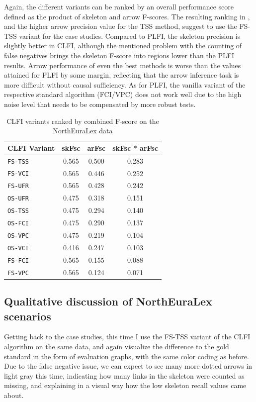 Again, the different variants can be ranked by an overall performance score defined as the product of skeleton and arrow F-scores. The resulting ranking in , and the higher arrow precision value for the TSS method, suggest to use the FS-TSS variant for the case studies. Compared to PLFI, the skeleton precision is slightly better in CLFI, although the mentioned problem with the counting of false negatives brings the skeleton F-score into regions lower than the PLFI results. Arrow performance of even the best methods is worse than the values attained for PLFI by some margin, reflecting that the arrow inference task is more difficult without causal sufficiency. As for PLFI, the vanilla variant of the respective standard algorithm (FCI/VPC) does not work well due to the high noise level that needs to be compensated by more robust tests.

\begin{table}
 \centering
 \begin{tabular}{lccc}
 \hline \hline
  CLFI Variant & skFsc & arFsc & skFsc $\ast$ arFsc\\ 
 \hline
\texttt{FS-TSS} & 0.565 & 0.500 & 0.283\\
\texttt{FS-VCI} & 0.565 & 0.446 & 0.252\\
\texttt{FS-UFR} & 0.565 & 0.428 & 0.242\\
\texttt{OS-UFR} & 0.475 & 0.318 & 0.151\\
\texttt{OS-TSS} & 0.475 & 0.294 & 0.140\\
\texttt{OS-FCI} & 0.475 & 0.290 & 0.137\\
\texttt{OS-VPC} & 0.475 & 0.219 & 0.104\\
\texttt{OS-VCI} & 0.416 & 0.247 & 0.103\\
\texttt{FS-FCI} & 0.565 & 0.155 & 0.088\\
\texttt{FS-VPC} & 0.565 & 0.124 & 0.071\\
  \hline
 \end{tabular}
 \caption{CLFI variants ranked by combined F-score on the NorthEuraLex data}
 \label{contact-variant-comparison-nelex}
\end{table}

\subsection{Qualitative discussion of NorthEuraLex scenarios}
Getting back to the case studies, this time I use the FS-TSS variant of the CLFI algorithm on the same data, and again visualize the difference to the gold standard in the form of evaluation graphs, with the same color coding as before. Due to the false negative issue, we can expect to see many more dotted arrows in light gray this time, indicating how many links in the skeleton were counted as missing, and explaining in a visual way how the low skeleton recall values came about.

